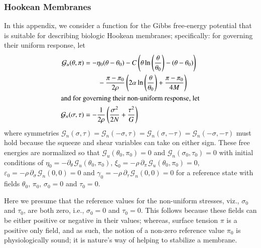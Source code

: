 \subsubsection{Hookean Membranes}

In this appendix, we consider a function for the Gibbs free-energy potential that is suitable for describing biologic Hookean membranes; specifically: for governing their uniform response, let
\begin{subequations}
    \label{GibbsMembraneEnergy}
    \begin{align}
    \mathcal{G}_u ( \theta , \pi ) & = -\eta_0 (\theta - \theta_0) -
    C \left( \theta \ln \left( \frac{\theta}{\theta_0} \right) - 
    ( \theta - \theta_0 ) \right) \notag \\
    \mbox{} & \qquad - \frac{\pi - \pi_0}{2 \rho} \left( 
    2\alpha \ln \left( \frac{\theta}{\theta_0} \right) + 
    \frac{\pi - \pi_0}{4M} \right) 
    \label{membraneUniform} \\
    \intertext{and for governing their non-uniform response, let}
    \mathcal{G}_n ( \sigma , \tau ) & = -\frac{1}{2 \rho} 
    \left( \frac{\sigma^2}{2N} + \frac{\tau^2}{G} \right)
    \label{membraneNonUniform}
    \end{align}
\end{subequations}
where symmetries $\mathcal{G}_n ( \sigma , \tau ) = \mathcal{G}_n ( -\sigma , \tau ) = \mathcal{G}_n ( \sigma , -\tau ) = \mathcal{G}_n ( -\sigma , -\tau )$ must hold because the squeeze and shear variables can take on either sign.  These free energies are normalized so that $\mathcal{G}_u (\theta_0 , \pi_0) = 0$ and $\mathcal{G}_n ( \sigma_0, \tau_0 ) = 0$ with initial conditions of $\eta_0 = -\partial_{\theta\,} \mathcal{G}_u (\theta_0 , \pi_0)$, $\xi_0 = -\rho \, \partial_{\pi\,} \mathcal{G}_u (\theta_0 , \pi_0) = 0$, $\varepsilon_0 = -\rho \, \partial_{\sigma\,} \mathcal{G}_n (0 , 0) = 0$ and $\gamma_0 = -\rho \, \partial_{\tau\,} \mathcal{G}_n (0 , 0) = 0$ for a reference state with fields $\theta_0$, $\pi_0$, $\sigma_0 = 0$ and $\tau_0 = 0$.

Here we presume that the reference values for the non-uniform stresses, viz., $\sigma_0$ and $\tau_0$, are both zero, i.e., $\sigma_0 = 0$ and $\tau_0 = 0$.  This follows because these fields can be either positive or negative in their values; whereas, surface tension $\pi$ is a positive only field, and as such, the notion of a non-zero reference value $\pi_0$ is physiologically sound; it is nature's way of helping to stabilize a membrane.

